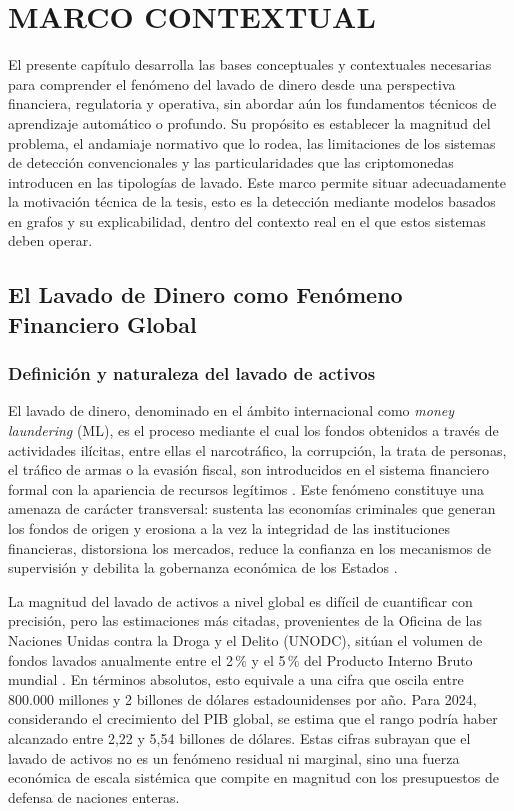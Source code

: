 \chapter{MARCO CONTEXTUAL}

El presente capítulo desarrolla las bases conceptuales y contextuales necesarias para comprender el fenómeno del lavado de dinero desde una perspectiva financiera, regulatoria y operativa, sin abordar aún los fundamentos técnicos de aprendizaje automático o profundo. Su propósito es establecer la magnitud del problema, el andamiaje normativo que lo rodea, las limitaciones de los sistemas de detección convencionales y las particularidades que las criptomonedas introducen en las tipologías de lavado. Este marco permite situar adecuadamente la motivación técnica de la tesis, esto es la detección mediante modelos basados en grafos y su explicabilidad, dentro del contexto real en el que estos sistemas deben operar.

\section{El Lavado de Dinero como Fenómeno Financiero Global}

\subsection{Definición y naturaleza del lavado de activos}

El lavado de dinero, denominado en el ámbito internacional como \textit{money laundering} (ML), es el proceso mediante el cual los fondos obtenidos a través de actividades ilícitas, entre ellas el narcotráfico, la corrupción, la trata de personas, el tráfico de armas o la evasión fiscal, son introducidos en el sistema financiero formal con la apariencia de recursos legítimos \cite{Spotlight2021Cryptocurrencies:Finances, Unagar2025SurveyXAI}. Este fenómeno constituye una amenaza de carácter transversal: sustenta las economías criminales que generan los fondos de origen y erosiona a la vez la integridad de las instituciones financieras, distorsiona los mercados, reduce la confianza en los mecanismos de supervisión y debilita la gobernanza económica de los Estados \cite{Subashi2024CryptocurrenciesLaundering}.

La magnitud del lavado de activos a nivel global es difícil de cuantificar con precisión, pero las estimaciones más citadas, provenientes de la Oficina de las Naciones Unidas contra la Droga y el Delito (UNODC), sitúan el volumen de fondos lavados anualmente entre el 2\,\% y el 5\,\% del Producto Interno Bruto mundial \cite{UNODC2024EstimatingCrimes}. En términos absolutos, esto equivale a una cifra que oscila entre 800.000 millones y 2 billones de dólares estadounidenses por año. Para 2024, considerando el crecimiento del PIB global, se estima que el rango podría haber alcanzado entre 2,22 y 5,54 billones de dólares. Estas cifras subrayan que el lavado de activos no es un fenómeno residual ni marginal, sino una fuerza económica de escala sistémica que compite en magnitud con los presupuestos de defensa de naciones enteras.

